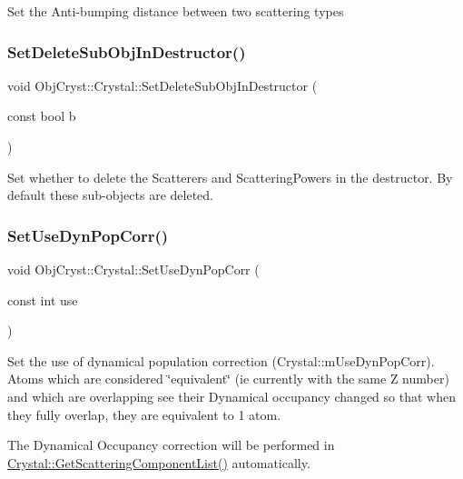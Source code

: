 Set the Anti-\/bumping distance between two scattering types \mbox{\label{class_obj_cryst_1_1_crystal_ae976f94ba642aa81cb7b23fcc1a56028}} 
\subsubsection{\texorpdfstring{SetDeleteSubObjInDestructor()}{SetDeleteSubObjInDestructor()}}
{\footnotesize\ttfamily void Obj\+Cryst\+::\+Crystal\+::\+Set\+Delete\+Sub\+Obj\+In\+Destructor (\begin{DoxyParamCaption}\item[{const bool}]{b }\end{DoxyParamCaption})}

Set whether to delete the Scatterers and Scattering\+Powers in the destructor. By default these sub-\/objects are deleted. \mbox{\label{class_obj_cryst_1_1_crystal_a511c3fcea43446634232eb6df345db9d}} 
\subsubsection{\texorpdfstring{SetUseDynPopCorr()}{SetUseDynPopCorr()}}
{\footnotesize\ttfamily void Obj\+Cryst\+::\+Crystal\+::\+Set\+Use\+Dyn\+Pop\+Corr (\begin{DoxyParamCaption}\item[{const int}]{use }\end{DoxyParamCaption})}

Set the use of dynamical population correction (Crystal\+::m\+Use\+Dyn\+Pop\+Corr). Atoms which are considered \char`\"{}equivalent\char`\"{} (ie currently with the same Z number) and which are overlapping see their Dynamical occupancy changed so that when they fully overlap, they are equivalent to 1 atom.

The Dynamical Occupancy correction will be performed in \mbox{\hyperlink{class_obj_cryst_1_1_crystal_a5ff33da1575572684743281c92f6596a}{Crystal\+::\+Get\+Scattering\+Component\+List()}} automatically.

